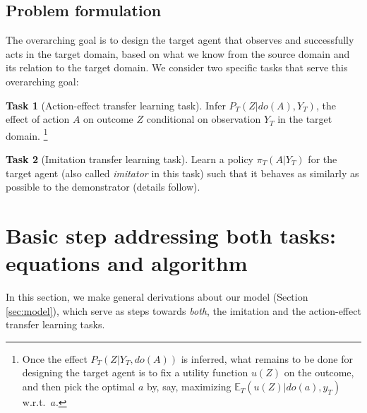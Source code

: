 \documentclass[letterpaper]{article} %
\theoremstyle{definition}%
\theoremstyle{definition}
\newtheorem{task}{Task}
\newcommand{\E}{\mathbb{E}}
\newcommand{\dob}[1]{do(#1)}
\newcommand{\Obs}{Y}
\newcommand{\obs}{y}
\newcommand{\Out}{Z}
\newcommand{\Dec}{Action-effect transfer learning task\xspace}
\newcommand{\todo}[1]{\textcolor{red}{#1}}
\newcommand{\defi}{\emph}
\begin{document}
\subsection{Problem formulation}
\label{sec:problem}


The overarching goal is to design the target agent that observes and successfully acts in the target domain, based on what we know from the source domain and its relation to the target domain.
We consider two specific tasks that serve this overarching goal:
\begin{task}[\Dec]
	\label{task:d}
	Infer $P_T(\Out|\dob{A}, Y_T)$, the effect of action $A$ on outcome $Z$ conditional on observation $Y_T$ in the target domain.%
	\footnote{Once the effect $P_T(\Out|Y_T, \dob{A})$ is inferred, what remains to be done for designing the target agent is to fix a utility function $u(\Out)$ on the outcome, and then pick the optimal $a$ by, say, maximizing $\E_T(u(\Out)|\dob{a}, y_T)$ w.r.t.\ $a$.}
\end{task}
\begin{task}[Imitation transfer learning task]
\label{task:i}
Learn a policy $\pi_T(A|\Obs_T)$ for the target agent (also called \defi{imitator} in this task) %
such that it behaves as similarly as possible to the demonstrator %
(details follow).
\end{task}





\section{Basic step addressing both tasks: equations and algorithm}
\label{sec:general}

In this section, we make general derivations about our model (Section \ref{sec:model}), which serve as steps towards \emph{both}, the imitation and the action-effect transfer learning tasks.

\end{document}

